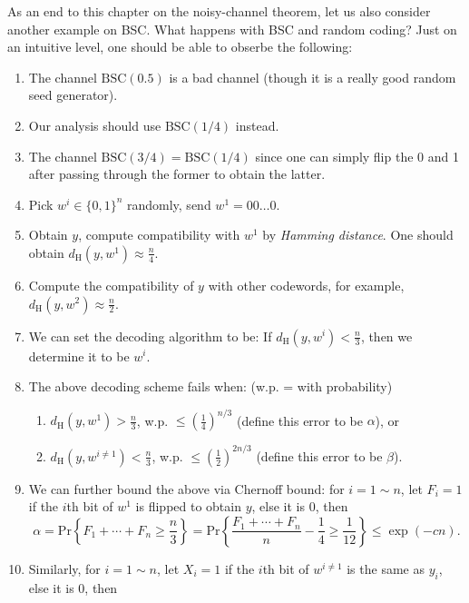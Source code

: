 As an end to this chapter on the noisy-channel theorem, let us also consider another example on BSC. What happens with BSC and random coding? Just on an intuitive level, one should be able to obserbe the following:
\begin{enumerate}
    \item The channel $\mathrm{BSC}(0.5)$ is a bad channel (though it is a really good random seed generator).
    \item Our analysis should use $\mathrm{BSC}\left(1/4\right)$ instead.
    \item The channel $\mathrm{BSC}\left(3/4\right) = \mathrm{BSC}\left(1/4\right)$ since one can simply flip the 0 and 1 after passing through the former to obtain the latter.
    \item Pick $w^i\in\{0,1\}^n$ randomly, send $w^1=00\ldots0$.
    \item Obtain $y$, compute compatibility with $w^1$ by \textit{Hamming distance}. One should obtain $d_\mathrm{H}(y,w^1)\approx \frac{n}{4}$.
    \item Compute the compatibility of $y$ with other codewords, for example, $d_\mathrm{H}(y,w^2) \approx \frac{n}{2}$.
    \item We can set the decoding algorithm to be: If $d_\mathrm{H}(y,w^i)<\frac{n}{3}$, then we determine it to be $w^i$.
    \item The above decoding scheme fails when: (w.p. = with probability)
    \begin{enumerate}[label=(\arabic*)]
        \item $d_\mathrm{H}(y,w^1) > \frac{n}{3}$, w.p. $\le\left(\frac{1}{4}\right)^{n/3}$ (define this error to be $\alpha$), or
        \item $d_\mathrm{H}(y,w^{i\neq1}) < \frac{n}{3}$, w.p. $\le \left(\frac{1}{2}\right)^{2n/3}$ (define this error to be $\beta$).
    \end{enumerate}
    \item We can further bound the above via Chernoff bound: for $i=1\sim n$, let $F_i=1$ if the $i$th bit of $w^1$ is flipped to obtain $y$, else it is 0, then
    \begin{equation*}
        \alpha = \mathrm{Pr}\left\{F_1+\cdots+F_n\ge\frac{n}{3}\right\} = \mathrm{Pr}\left\{\frac{F_1+\cdots+F_n}{n} - \frac{1}{4}\ge\frac{1}{12}\right\} \le \exp(-cn).
    \end{equation*}
    \item Similarly, for $i=1\sim n$, let $X_i=1$ if the $i$th bit of $w^{i\neq1}$ is the same as $y_i$, else it is 0, then

\end{enumerate}
